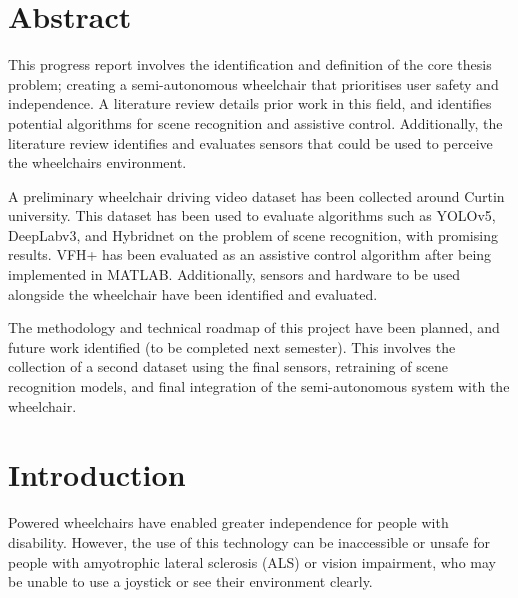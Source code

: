 \documentclass[12pt]{article}
\begin{document}

\thispagestyle{empty}
\pagebreak






\section*{Abstract}

This progress report involves the identification and definition of the core thesis problem;
creating a semi-autonomous wheelchair that prioritises user safety and independence.
A literature review details prior work in this field, and identifies potential algorithms
for scene recognition and assistive control. Additionally, the literature review identifies and evaluates
sensors that could be used to perceive the wheelchairs environment.

A preliminary wheelchair driving video dataset has been collected around Curtin university.
This dataset has been used to evaluate algorithms such as YOLOv5, DeepLabv3, and Hybridnet on
the problem of scene recognition, with promising results. VFH+ has been evaluated as an assistive
control algorithm after being implemented in MATLAB. Additionally, sensors and hardware to be used
alongside the wheelchair have been identified and evaluated.

The methodology and technical roadmap of this project have been planned, and future work identified (to be completed
next semester). This involves the collection of a second dataset using the final sensors, retraining of
scene recognition models, and final integration of the semi-autonomous system with the wheelchair.

\pagebreak

\renewcommand{\contentsname}{Table of Contents}
\tableofcontents
\pagebreak
\listoffigures
\listoftables
\pagebreak





\section{Introduction}
Powered wheelchairs have enabled greater independence for people with disability.
However, the use of this technology can be inaccessible or unsafe for people
with amyotrophic lateral sclerosis (ALS) or vision impairment,
who may be unable to use a joystick or see their environment clearly.
\end{document}
